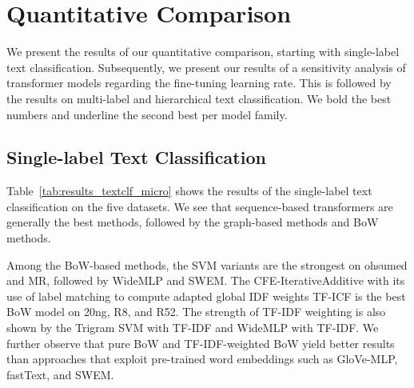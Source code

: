 \documentclass[lettersize,journal]{IEEEtran}
\newcommand{\mytextsubscript}[1]{{\color{black}\textsubscript{#1}}}
\begin{document}
\section{Quantitative Comparison}\label{sec:results}

We present the results of our quantitative comparison, starting with single-label text classification.
Subsequently, we present our results of a sensitivity analysis of transformer models regarding the fine-tuning learning rate.
This is followed by the results on multi-label and hierarchical text classification.
We bold the best numbers and underline the second best per model family.

\subsection{Single-label Text Classification}

\renewcommand{\mytextsubscript}[1]{{\color{black}~\textsubscript{#1}}}
\newcommand\mycaption{Results for the single-label
text classification datasets. For our experiments, we report the mean accuracy
and standard deviation (SD) over five runs. For numbers from the literature, we
report the SD if available. GPT-3.5 methods use 16 examples per class for
in-context learning, and the (R.S)-variant uses a Sup-SimCSE-RoBERTa-Large sampler to select
these examples. Column ``Provenance'' reports the source. d.\,f. is short for the use of a different variant of the dataset or a different split, and thus, the number is omitted to ensure comparability.}
\newcommand\mylabel{\label{tab:results_textclf_micro}}


Table~\ref{tab:results_textclf_micro} shows the results of the single-label text classification on the five datasets.
We see that sequence-based transformers are generally the best methods, followed by the graph-based methods and BoW methods.

Among the BoW-based methods, the SVM variants are the strongest on ohsumed and MR, followed by WideMLP and SWEM.
The CFE-IterativeAdditive with its use of label matching to compute adapted global IDF weights TF-ICF is the best BoW model on 20ng, R8, and R52.
The strength of TF-IDF weighting is also shown by the Trigram SVM with TF-IDF and WideMLP with TF-IDF.
We further observe that pure BoW and TF-IDF-weighted BoW yield better results than approaches that exploit pre-trained word embeddings such as GloVe-MLP, fastText, and SWEM.
\end{document}

